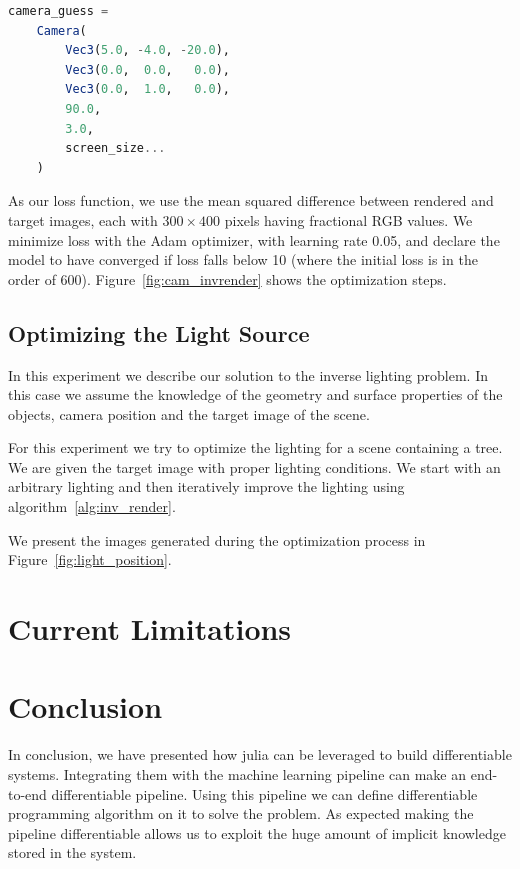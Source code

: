 \documentclass{juliacon}
\begin{document}
\noindent
\begin{minipage}{\linewidth}
\begin{lstlisting}[caption = {Initial Guess of the Camera Parameters},
                   label = {lst:cam_initial},
                   captionpos = b,
                   language = Julia]
camera_guess =
    Camera(
        Vec3(5.0, -4.0, -20.0),
        Vec3(0.0,  0.0,   0.0),
        Vec3(0.0,  1.0,   0.0),
        90.0,
        3.0,
        screen_size...
    )
\end{lstlisting}
\end{minipage}

As our loss function, we use the mean squared difference between rendered and target images, each with $300\times400$ pixels having fractional RGB values. We minimize loss with the Adam optimizer, with learning rate 0.05, and declare the model to have converged if loss falls below 10 (where the initial loss is in the order of 600). Figure~\ref{fig:cam_invrender} shows the optimization steps.

\subsection{\textbf{Optimizing the Light Source}}

In this experiment we describe our solution to the inverse lighting problem. In this case we assume the knowledge of the geometry and surface properties of the objects, camera position and the target image of the scene.

For this experiment we try to optimize the lighting for a scene containing a tree. We are given the target image with proper lighting conditions. We start with an arbitrary lighting and then iteratively improve the lighting using algorithm~\ref{alg:inv_render}.

We present the images generated during the optimization process in Figure~\ref{fig:light_position}.

\section{Current Limitations}


\section{Conclusion}
In conclusion, we have presented how julia can be leveraged to build differentiable systems. Integrating them with the machine learning pipeline can make an end-to-end differentiable pipeline. Using this pipeline we can define differentiable programming algorithm on it to solve the problem. As expected making the pipeline differentiable allows us to exploit the huge amount of implicit knowledge stored in the system.




\end{document}

